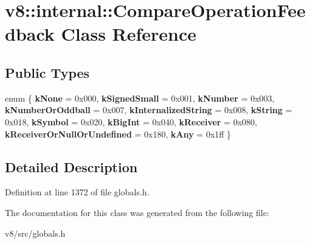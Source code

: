 \hypertarget{classv8_1_1internal_1_1CompareOperationFeedback}{}\section{v8\+:\+:internal\+:\+:Compare\+Operation\+Feedback Class Reference}
\label{classv8_1_1internal_1_1CompareOperationFeedback}
\subsection*{Public Types}
\begin{DoxyCompactItemize}
\item 
\mbox{\label{classv8_1_1internal_1_1CompareOperationFeedback_a5c70a520b2d429c923d7923231525ae0}} 
enum \{ \newline
{\bfseries k\+None} = 0x000, 
{\bfseries k\+Signed\+Small} = 0x001, 
{\bfseries k\+Number} = 0x003, 
{\bfseries k\+Number\+Or\+Oddball} = 0x007, 
\newline
{\bfseries k\+Internalized\+String} = 0x008, 
{\bfseries k\+String} = 0x018, 
{\bfseries k\+Symbol} = 0x020, 
{\bfseries k\+Big\+Int} = 0x040, 
\newline
{\bfseries k\+Receiver} = 0x080, 
{\bfseries k\+Receiver\+Or\+Null\+Or\+Undefined} = 0x180, 
{\bfseries k\+Any} = 0x1ff
 \}
\end{DoxyCompactItemize}


\subsection{Detailed Description}


Definition at line 1372 of file globals.\+h.



The documentation for this class was generated from the following file\+:\begin{DoxyCompactItemize}
\item 
v8/src/globals.\+h\end{DoxyCompactItemize}
